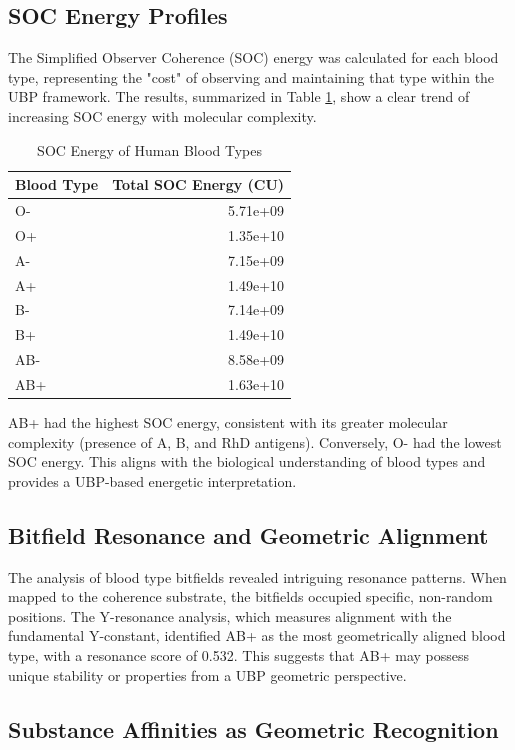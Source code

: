\documentclass{article}
\begin{document}
\subsection{SOC Energy Profiles}

The Simplified Observer Coherence (SOC) energy was calculated for each blood type, representing the "cost" of observing and maintaining that type within the UBP framework. The results, summarized in Table \ref{tab:soc_energy}, show a clear trend of increasing SOC energy with molecular complexity.

\begin{table}[h!]
\centering
\caption{SOC Energy of Human Blood Types}
\label{tab:soc_energy}
\begin{tabular}{@{}lr@{}}
\toprule
Blood Type & Total SOC Energy (CU) \\
\midrule
O- & 5.71e+09 \\
O+ & 1.35e+10 \\
A- & 7.15e+09 \\
A+ & 1.49e+10 \\
B- & 7.14e+09 \\
B+ & 1.49e+10 \\
AB- & 8.58e+09 \\
AB+ & 1.63e+10 \\
\bottomrule
\end{tabular}
\end{table}

AB+ had the highest SOC energy, consistent with its greater molecular complexity (presence of A, B, and RhD antigens). Conversely, O- had the lowest SOC energy. This aligns with the biological understanding of blood types and provides a UBP-based energetic interpretation.

\subsection{Bitfield Resonance and Geometric Alignment}

The analysis of blood type bitfields revealed intriguing resonance patterns. When mapped to the coherence substrate, the bitfields occupied specific, non-random positions. The Y-resonance analysis, which measures alignment with the fundamental Y-constant, identified AB+ as the most geometrically aligned blood type, with a resonance score of 0.532. This suggests that AB+ may possess unique stability or properties from a UBP geometric perspective.

\subsection{Substance Affinities as Geometric Recognition}
\end{document}
